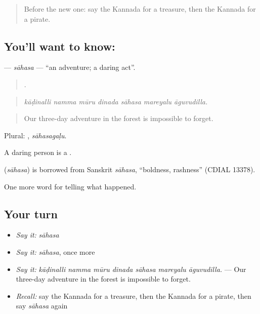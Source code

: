 \label{lesson:KA-C348-sahasa}



\begin{quote}
Before the new one: say the Kannada for a treasure, then the Kannada for a pirate.
\end{quote}

\subsection*{You'll want to know: }
\textbf{} — \emph{sāhasa} — \textquotedblleft{}an adventure; a daring act\textquotedblright{}.

\begin{quote}
      .
\end{quote}

\begin{quote}
\emph{kāḍinalli namma mūru dinada sāhasa mareyalu āguvudilla.}
\end{quote}

\begin{quote}
Our three-day adventure in the forest is impossible to forget.
\end{quote}

Plural: , \emph{sāhasagaḷu}.

A daring person is a .

\begin{cousinweb}
\textbf{} (\emph{sāhasa}) is borrowed from Sanskrit \emph{sāhasa}, \textquotedblleft{}boldness, rashness\textquotedblright{} (CDIAL 13378).
\end{cousinweb}

\begin{grammarlens}[title={What you've built}]
One more word for telling what happened.
\end{grammarlens}

\subsection*{Your turn}
\begin{itemize}
\raggedright
  \item \emph{Say it:} \emph{sāhasa}
  \item \emph{Say it:} \emph{sāhasa}, once more
  \item \emph{Say it:} \emph{kāḍinalli namma mūru dinada sāhasa mareyalu āguvudilla.} — Our three-day adventure in the forest is impossible to forget.
  \item \emph{Recall:} say the Kannada for a treasure, then the Kannada for a pirate, then say \emph{sāhasa} again
\end{itemize}

